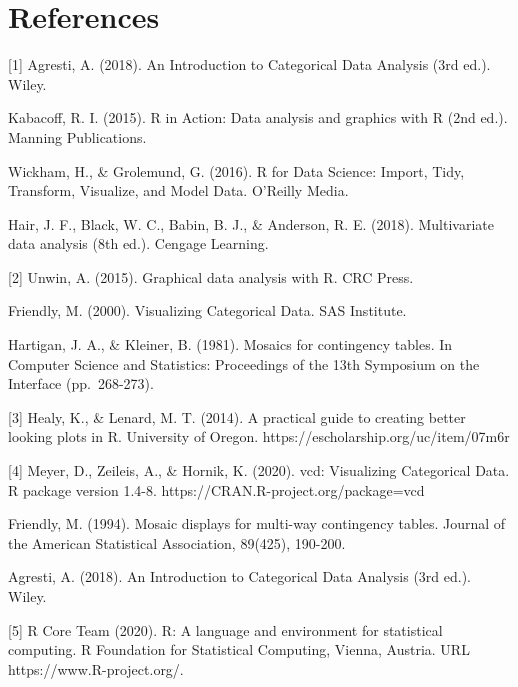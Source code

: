 \documentclass[
  letterpaper,
  DIV=11,
  numbers=noendperiod]{scrreport}
\begin{document}
\hypertarget{references}{%
\section{References}\label{references}}

{[}1{]} Agresti, A. (2018). An Introduction to Categorical Data Analysis
(3rd ed.). Wiley.

Kabacoff, R. I. (2015). R in Action: Data analysis and graphics with R
(2nd ed.). Manning Publications.

Wickham, H., \& Grolemund, G. (2016). R for Data Science: Import, Tidy,
Transform, Visualize, and Model Data. O'Reilly Media.

Hair, J. F., Black, W. C., Babin, B. J., \& Anderson, R. E. (2018).
Multivariate data analysis (8th ed.). Cengage Learning.

{[}2{]} Unwin, A. (2015). Graphical data analysis with R. CRC Press.

Friendly, M. (2000). Visualizing Categorical Data. SAS Institute.

Hartigan, J. A., \& Kleiner, B. (1981). Mosaics for contingency tables.
In Computer Science and Statistics: Proceedings of the 13th Symposium on
the Interface (pp.~268-273).

{[}3{]} Healy, K., \& Lenard, M. T. (2014). A practical guide to
creating better looking plots in R. University of Oregon.
https://escholarship.org/uc/item/07m6r

{[}4{]} Meyer, D., Zeileis, A., \& Hornik, K. (2020). vcd: Visualizing
Categorical Data. R package version 1.4-8.
https://CRAN.R-project.org/package=vcd

Friendly, M. (1994). Mosaic displays for multi-way contingency tables.
Journal of the American Statistical Association, 89(425), 190-200.

Agresti, A. (2018). An Introduction to Categorical Data Analysis (3rd
ed.). Wiley.

{[}5{]} R Core Team (2020). R: A language and environment for
statistical computing. R Foundation for Statistical Computing, Vienna,
Austria. URL https://www.R-project.org/.
\end{document}
